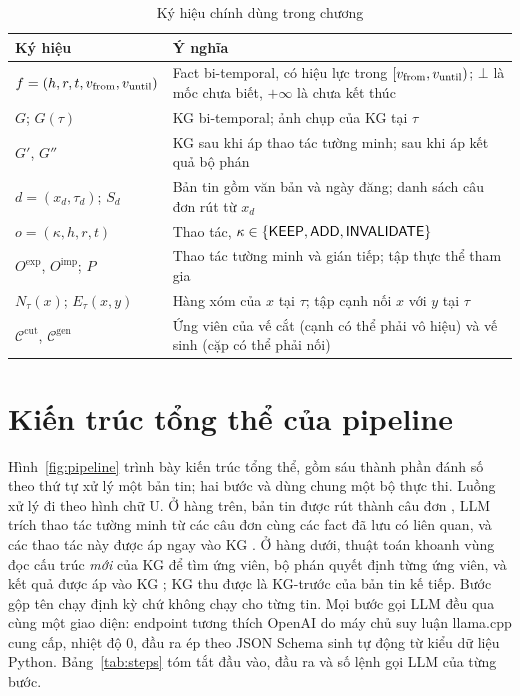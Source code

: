 \begin{table}[!htbp]
\centering
\caption{Ký hiệu chính dùng trong chương}
\label{tab:notation}
\small
\renewcommand{\arraystretch}{1.2}
\begin{tabular}{@{}>{\raggedright\arraybackslash}p{3.7cm}>{\raggedright\arraybackslash}p{11.3cm}@{}}
\toprule
Ký hiệu & Ý nghĩa \\
\midrule
$f=(h,r,t,v_{\mathrm{from}},v_{\mathrm{until}})$ & Fact bi-temporal, có hiệu lực trong $[v_{\mathrm{from}},v_{\mathrm{until}})$; $\bot$ là mốc chưa biết, $+\infty$ là chưa kết thúc \\
$G$; $G(\tau)$ & KG bi-temporal; ảnh chụp của KG tại $\tau$ \\
$G'$, $G''$ & KG sau khi áp thao tác tường minh; sau khi áp kết quả bộ phán \\
$d=(x_d,\tau_d)$; $S_d$ & Bản tin gồm văn bản và ngày đăng; danh sách câu đơn rút từ $x_d$ \\
$o=(\kappa,h,r,t)$ & Thao tác, $\kappa\in\{\textsf{KEEP},\textsf{ADD},\textsf{INVALIDATE}\}$ \\
$O^{\mathrm{exp}}$, $O^{\mathrm{imp}}$; $P$ & Thao tác tường minh và gián tiếp; tập thực thể tham gia \\
$N_\tau(x)$; $E_\tau(x,y)$ & Hàng xóm của $x$ tại $\tau$; tập cạnh nối $x$ với $y$ tại $\tau$ \\
$\mathcal{C}^{\mathrm{cut}}$, $\mathcal{C}^{\mathrm{gen}}$ & Ứng viên của vế cắt (cạnh có thể phải vô hiệu) và vế sinh (cặp có thể phải nối) \\
\bottomrule
\end{tabular}
\end{table}

\section{Kiến trúc tổng thể của pipeline}\label{sec:architecture}

Hình~\ref{fig:pipeline} trình bày kiến trúc tổng thể, gồm sáu thành phần đánh số theo thứ tự xử lý một bản tin; hai bước  và  dùng chung một bộ thực thi.
Luồng xử lý đi theo hình chữ U.
Ở hàng trên, bản tin được rút thành câu đơn , LLM trích thao tác tường minh  từ các câu đơn cùng các fact đã lưu có liên quan, và các thao tác này được áp ngay vào KG .
Ở hàng dưới, thuật toán khoanh vùng  đọc cấu trúc \emph{mới} của KG để tìm ứng viên, bộ phán  quyết định từng ứng viên, và kết quả được áp vào KG ; KG thu được là KG-trước của bản tin kế tiếp.
Bước gộp tên  chạy định kỳ chứ không chạy cho từng tin.
Mọi bước gọi LLM đều qua cùng một giao diện: endpoint tương thích OpenAI do máy chủ suy luận llama.cpp cung cấp, nhiệt độ 0, đầu ra ép theo JSON Schema sinh tự động từ kiểu dữ liệu Python.
Bảng~\ref{tab:steps} tóm tắt đầu vào, đầu ra và số lệnh gọi LLM của từng bước.


